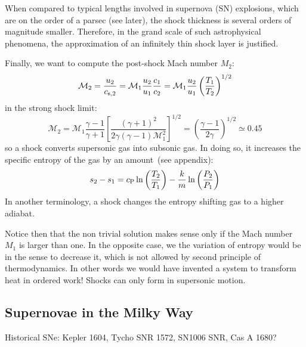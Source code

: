 When compared to typical lengths involved in supernova (SN) explosions, which are on the order of a parsec (see later), the shock thickness is several orders of magnitude smaller. Therefore, in the grand scale of such astrophysical phenomena, the approximation of an infinitely thin shock layer is justified.

Finally, we want to compute the post-shock Mach number \( M_2 \):
%
\begin{equation}
\mathcal M_2 = \frac{u_2}{c_{\rm s,2}} = \mathcal M_1 \frac{u_2}{u_1} \frac{c_1}{c_2} = \mathcal M_1 \frac{u_2}{u_1} \left( \frac{T_1}{T_2} \right)^{1/2}
\end{equation}
%
in the strong shock limit:
%
\begin{equation}
\mathcal M_2 = \mathcal M_1 \frac{\gamma - 1}{\gamma + 1} \left[ \frac{(\gamma + 1)^2}{2\gamma(\gamma - 1) \mathcal M_1^2} \right]^{1/2} = \left( \frac{\gamma - 1}{2\gamma} \right)^{1/2} \simeq 0.45 
\end{equation}
%
so a shock converts supersonic gas into subsonic gas.
%
In doing so, it increases the specific entropy of the gas by an amount~(see appendix):
%
\begin{equation}
s_2 - s_1 = c_{\rm P} \ln \left(\frac{T_2}{T_1}\right) - \frac{k}{m} \ln \left( \frac{P_2}{P_1} \right)
\end{equation}
%
In another terminology, a shock changes the entropy shifting gas to a higher adiabat.

Notice then that the non trivial solution makes sense only if the Mach number $M_1$ is larger than one. In the opposite case, we the variation of entropy would be in the sense to decrease it, which is not allowed by second principle of thermodynamics. 
%
In other words we would have invented a system to transform heat in ordered work! Shocks can only form in supersonic motion.

\subsection{Supernovae in the Milky Way}

Historical SNe: Kepler 1604, {\color{red}Tycho SNR 1572}, SN1006 SNR, Cas A 1680?

